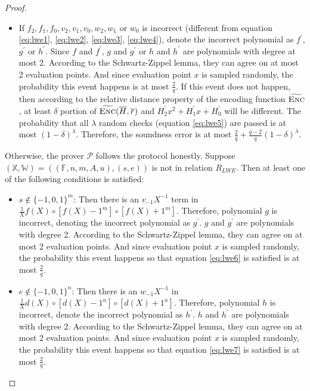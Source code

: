 \begin{proof}
\begin{itemize}
    \item If $f_2, f_1, f_0, v_2, v_1, v_0, w_2, w_1$ or $w_0$ is incorrect (different from equation \ref{eq:lwe1}, \ref{eq:lwe2}, \ref{eq:lwe3}, \ref{eq:lwe4}), denote the incorrect polynomial as $f^\prime$, $g^\prime$ or $h^\prime$. Since $f$ and $f^\prime$, $g$ and $g^\prime$ or $h$ and $h^\prime$ are polynomials with degree at most 2. According to the Schwartz-Zippel lemma, they can agree on at most 2 evaluation points. And since evaluation point $x$ is sampled randomly, the probability this event happens is at most $\frac{2}{q}$. If this event does not happen, then according to the relative distance property of the encoding function $\widetilde{\textsc{Enc}}$, at least $\delta$ portion of $\widetilde{\textsc{Enc}}(\overline{H}, \overline{r})$ and $H_2^\prime x^2 + H_1^\prime x + H_0^\prime$ will be different. The probability that all $\lambda$ random checks (equation \ref{eq:lwe5}) are passed is at most $(1 - \delta)^\lambda$. Therefore, the soundness error is at most $\frac{2}{q} + \frac{q-2}{q}(1 - \delta)^\lambda$.


\end{itemize}

Otherwise, the prover $\mathcal{P}$ follows the protocol honestly. Suppose $(\mathbb{X}, \mathbb{W}) = ((\mathbb{F}, n, m, A, u), (s, e))$ is not in relation $R_{LWE}$. Then at least one of the following conditions is satisfied:
\begin{itemize}
    \item $s \notin \{-1, 0, 1\}^{m}$: Then there is an $v_{-1} X^{-1}$ term in $\frac{1}{X} f(X) \circ [f(X) - 1^m] \circ [f(X) + 1^m]$. Therefore, polynomial $g$ is incorrect, denoting the incorrect polynomial as $g^\prime$. $g$ and $g^\prime$ are polynomials with degree 2. According to the Schwartz-Zippel lemma, they can agree on at most 2 evaluation points. And since evaluation point $x$ is sampled randomly, the probability this event happens so that equation \ref{eq:lwe6} is satisfied is at most $\frac{2}{q}$. 
    
    \item $e \notin \{-1, 0, 1\}^{n}$: Then there is an $w_{-1} X^{-1}$ in $\frac{1}{X} d(X) \circ [d(X) - 1^n] \circ [d(X) + 1^n]$. Therefore, polynomial $h$ is incorrect, denote the incorrect polynomial as $h^\prime$. $h$ and $h^\prime$ are polynomials with degree 2. According to the Schwartz-Zippel lemma, they can agree on at most 2 evaluation points. And since evaluation point $x$ is sampled randomly, the probability this event happens so that equation \ref{eq:lwe7} is satisfied is at most $\frac{2}{q}$. 
    

\end{itemize}
\end{proof}
